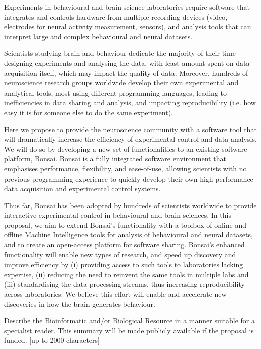 Experiments in behavioural and brain science laboratories require software that integrates and controls hardware from multiple recording devices (video, electrodes for neural activity measurement, sensors), and analysis tools that can interpret large and complex behavioural and neural datasets. 

Scientists studying brain and behaviour dedicate the majority of their time designing experiments and analysing the data, with least amount spent on data acquisition itself, which may impact the quality of data. Moreover, hundreds of neuroscience research groups worldwide develop their own experimental and analytical tools, most using different programming languages, leading to  inefficiencies in data sharing and analysis, and impacting reproducibility (i.e. how easy it is for someone else to do the same experiment). 

Here we propose to provide the neuroscience community with a software tool that will dramatically increase the efficiency of experimental control and data analysis. We will do so by developing a new set of functionalities to an existing software platform, Bonsai. Bonsai is a fully integrated software environment that emphasises performance, flexibility, and ease-of-use, allowing scientists with no previous programming experience to quickly develop their own high-performance data acquisition and experimental control systems.

Thus far, Bonsai has been adopted by hundreds of scientists worldwide to provide interactive experimental control in behavioural and brain sciences. In this proposal, we aim to extend Bonsai’s functionality with a toolbox of online and offline Machine Intelligence tools for analysis of behavioural and neural datasets, and to create an open-access platform for software sharing. Bonsai’s enhanced functionality will enable new types of research, and speed up discovery and improve efficiency by (i) providing access to such tools to laboratories lacking expertise, (ii) reducing the need to reinvent the same tools in multiple labs and (iii) standardising the data processing streams, thus increasing reproducibility across laboratories. We believe this effort will enable and accelerate new discoveries in how the brain generates behaviour. 



Describe the Bioinformatic and/or Biological Resource in a manner suitable for a specialist reader. This summary will be made publicly available if the proposal is funded. [up to 2000 characters]

